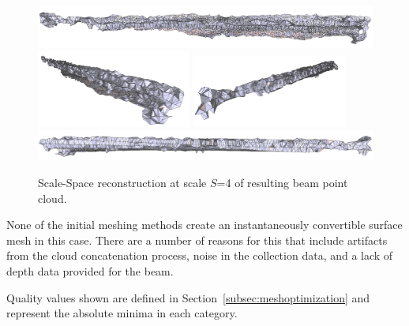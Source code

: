 \documentclass[12pt]{drexelthesis}
\begin{document}
\begin{figure}[!ht]
	\centering
		\includegraphics[width=5in]{real-lab-scans/meshedNeat/scalespace400.png}
		\includegraphics[width=2in]{real-lab-scans/meshedNeat/scalespace401.png}
		\includegraphics[width=2in]{real-lab-scans/meshedNeat/scalespace402.png}
		\includegraphics[width=5in]{real-lab-scans/meshedNeat/scalespace403.png}
		\caption[Scale-Space reconstruction at scale $S$=4 of segmented LiDAR data]{\centering Scale-Space reconstruction at scale $S$=4 of resulting beam point cloud.}
	\label{lidar:scalespace4}
\end{figure}

None of the initial meshing methods create an instantaneously convertible surface mesh in this case. There are a number of reasons for this that include artifacts from the cloud concatenation process, noise in the collection data, and a lack of depth data provided for the beam.

\begin{table}[!ht]
	\centering
		\caption[HDL-32E LiDAR scan initial mesh quality]{Quality analysis of initial meshing methods.}
	Quality values shown are defined in Section~\ref{subsec:meshoptimization} and represent the absolute minima in each category.
	\label{table:realInit}
\end{table}
\end{document}
